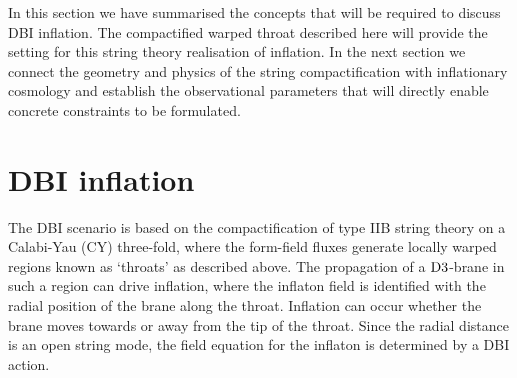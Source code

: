 In this section we have summarised the concepts that will be
required to discuss DBI inflation. The compactified warped throat described
here will provide the setting for this string theory realisation of
inflation. 
In the next
section we connect the geometry and physics of the string compactification with
inflationary cosmology and establish the observational parameters that will directly
enable concrete constraints to be formulated. 

% 
% 
\section{DBI inflation} 
% 
\label{sec:dbiinflation}
The DBI scenario is based on the compactification of type IIB string theory on a 
Calabi-Yau (CY) three-fold, where the form-field fluxes generate locally
warped regions known as `throats' as described above.  The propagation of a 
${\rm D3}$-brane in such a region can drive inflation, where the inflaton 
field is identified with the radial position of the brane 
along the throat. Inflation can occur whether the brane moves towards or away from the tip of the
throat.
Since the radial distance is an open string mode, the field 
equation for the inflaton is determined by a DBI action.

